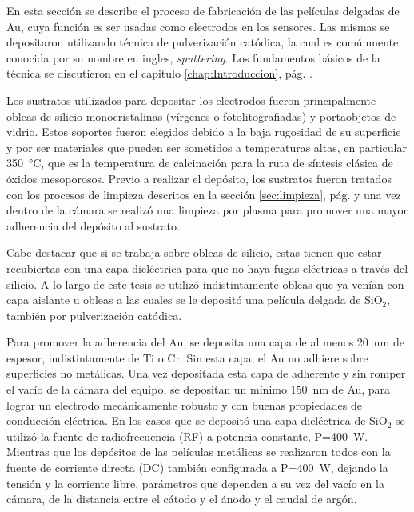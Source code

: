 			En esta sección se describe el proceso de fabricación de las películas delgadas de Au, cuya función es ser usadas como electrodos en los sensores. Las mismas se depositaron utilizando técnica de pulverización catódica, la cual es comúnmente conocida por su nombre en ingles, \textit{sputtering}\cite{sigmund1968}. Los fundamentos básicos de la técnica se discutieron en el capitulo \ref{chap:Introduccion}, pág. \pageref{sec:microfabricacion}.
							
			Los sustratos utilizados para depositar los electrodos fueron principalmente obleas de silicio monocristalinas (vírgenes o fotolitografiadas) y portaobjetos de vidrio. Estos soportes fueron elegidos debido a la baja rugosidad de su superficie y por ser materiales que pueden ser sometidos a temperaturas altas, en particular \SI{350}{\celsius}, que es la temperatura de calcinación para la ruta de síntesis clásica de óxidos mesoporosos. Previo a realizar el depósito, los sustratos fueron tratados con los procesos de limpieza descritos en la sección \ref{sec:limpieza}, pág. \pageref{sec:limpieza} y una vez dentro de la cámara se realizó una limpieza por plasma para promover una mayor adherencia del depósito al sustrato.

			Cabe destacar que si se trabaja sobre obleas de silicio, estas tienen que estar recubiertas con una capa dieléctrica para que no haya fugas eléctricas a través del silicio. A lo largo de este tesis se utilizó indistintamente obleas que ya venían con capa aislante u obleas a las cuales se le depositó una película delgada de SiO$_2$, también por pulverización catódica.

			Para promover la adherencia del Au, se deposita una capa de al menos \SI{20}{\nm} de espesor, indistintamente de Ti o Cr. Sin esta capa, el Au no adhiere sobre superficies no metálicas\cite{Hieber1976}. Una vez depositada esta capa de adherente y sin romper el vacío de la cámara del equipo, se depositan un mínimo \SI{150}{\nm} de Au, para lograr un electrodo mecánicamente robusto y con buenas propiedades de conducción eléctrica. En los casos que se depositó una capa dieléctrica de SiO$_2$ se utilizó la fuente de radiofrecuencia (RF) a potencia constante, P=\SI{400}{W}. Mientras que los depósitos de las películas metálicas se realizaron todos con la fuente de corriente directa (DC) también configurada a P=\SI{400}{W}, dejando la tensión y la corriente libre, parámetros que dependen a su vez del vacío en la cámara, de la distancia entre el cátodo y el ánodo y el caudal de argón. 


